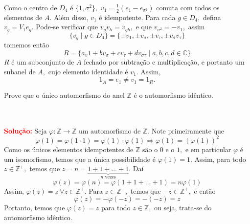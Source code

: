 \documentclass[11pt,a4paper]{article}
\newcounter{exercicio}[section]
\newcommand{\solucao}[1]{
\textbf{\textcolor{white}{oi}\\ \\ \textcolor{red}{Solução:}} #1}
\begin{document}
{\noindent
Como o centro de $D_4$ é $\{1, \sigma^2 \},$ $v_1 = \frac{1}{2}(e_1 - e_{\sigma^2})$ comuta com todos os elementos de $A.$ Além disso, $v_1$ é idempotente. Para cada $g \in D_4,$ defina $v_g = V_1 e_g.$ Pode-se verificar que $v_g v_h = v_{gh},$ e que $v_{\sigma^2} = -v_1,$ assim
\[
\{ v_g \mid g \in D_4 \} = \{\pm v_1, \pm v_\sigma, \pm v_\tau, \pm v_\sigma v_\tau \}
\]
tomemos então
\[
R = \{ a_v1 + bv_\sigma + cv_\tau + d v_{\sigma \tau} \mid a,b,c,d \in \mathbb{C} \}
\]
$R$ é um subconjunto de $A$ fechado por subtração e multiplicação, e portanto um subanel de $A,$ cujo elemento identidade é $v_1.$ Assim,
\[
1_A = e_1 \neq v_1 = 1_R.
\]
}

 Prove que o único automorfismo do anel $\mathbb{Z}$ é o automorfismo idêntico.
\solucao{
Seja $\varphi \colon \mathbb{Z} \to \mathbb{Z}$ um automorfismo de $\mathbb{Z}.$ Note primeiramente que
\[
\varphi(1) = \varphi(1 \cdot 1) = \varphi(1) \cdot \varphi(1) \Rightarrow \varphi(1) = (\varphi(1))^2
\]
Como os únicos elementos idempotentes de $\mathbb{Z}$ são o $0$ e o $1,$ e em particular $\varphi$ é um isomorfismo, temos que a única possibilidade é $\varphi(1) = 1.$ Assim, para todo $z \in \mathbb{Z}^{+},$ temos que $z = n = \underbrace{1 + 1 + \ldots + 1}_{n \mbox{ vezes}}.$ Daí
\[
\varphi(z) = \varphi(n) = \varphi(1 + 1 + \ldots + 1) = n \varphi(1)
\]
Assim, $\varphi(z) = z \ \forall z \in \mathbb{Z}^{+}.$ Para $z \in \mathbb{Z}^{-},$ temos que $-z \in \mathbb{Z}^{+},$ e então
\[
\varphi(z) = -\varphi(-z) = -(-z) = z
\]
Portanto, temos que $\varphi(z) = z$ para todo $z \in \mathbb{Z},$ ou seja, trata-se do automorfismo idêntico.
}
\end{document}
